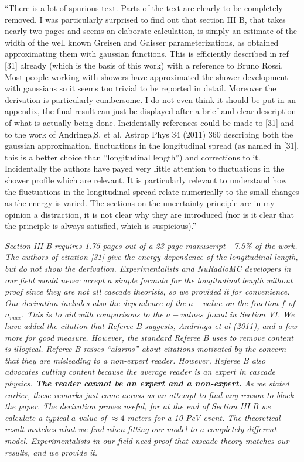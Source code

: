 \documentclass[12pt]{article}
\begin{document}
``There is a lot of spurious text. Parts of the text are clearly to be completely removed. I was particularly surprised to find out that section III B, that takes nearly two pages and seems an elaborate calculation, is simply an estimate of the width of the well known Greisen and Gaisser parameterizations, as obtained approximating them with gaussian functions. This is efficiently described in ref [31] already (which is the basis of this work) with a reference to Bruno Rossi. Most people working with showers have approximated the shower development with gaussians so it seems too trivial to be reported in detail. Moreover the derivation is particularly cumbersome. I do not even think it should be put in an appendix, the final result can just be displayed after a brief and clear description of what is actually being done. Incidentally references could be made to [31] and to the work of Andringa,S. et al. Astrop Phys 34 (2011) 360 describing both the gaussian approximation, fluctuations in the longitudinal spread (as named in [31], this is a better choice than ''longitudinal length'') and corrections to it. Incidentally the authors have payed very little attention to fluctuations in the shower profile which are relevant. It is particularly relevant to understand how the fluctuations in the longitudinal spread relate numerically to the small changes as the energy is varied. The sections on the uncertainty principle are in my opinion a distraction, it is not clear why they are introduced (nor is it clear that the principle is always satisfied, which is suspicious).''

\textit{Section III B requires 1.75 pages out of a 23 page manuscript - 7.5\% of the work.  The authors of citation [31] give the energy-dependence of the longitudinal length, but do not show the derivation.  Experimentalists and NuRadioMC developers in our field would never accept a simple formula for the longitudinal length without proof since they are not all cascade theorists, so we provided it for convenience.  Our derivation includes also the dependence of the $a-value$ on the fraction $f$ of $n_{max}$.  This is to aid with comparisons to the $a-values$ found in Section VI.  We have added the citation that Referee B suggests, Andringa et al (2011), and a few more for good measure.  However, the standard Referee B uses to remove content is illogical.  Referee B raises ``alarms'' about citations motivated by the concern that they are misleading to a non-expert reader.  However, Referee B also advocates cutting content because the average reader is an expert in cascade physics.  \textbf{The reader cannot be an expert and a non-expert.}  As we stated earlier, these remarks just come across as an attempt to find any reason to block the paper.  The derivation proves useful, for at the end of Section III B we calculate a typical $a$-value of $\approx 4$ meters for a 10 PeV event.  The theoretical result matches what we find when fitting our model to a completely different model.  Experimentalists in our field need proof that cascade theory matches our results, and we provide it.}
\end{document}
